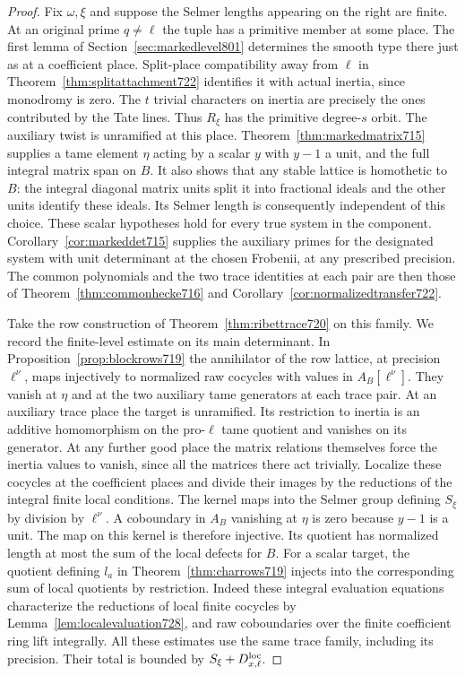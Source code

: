 \documentclass[a4paper,11pt]{article}
\theoremstyle{definition}
\theoremstyle{remark}
\numberwithin{equation}{section}
\begin{document}
\begin{proof}
Fix \(\omega,\xi\) and suppose the Selmer lengths appearing
on the right are finite. At an original prime \(q\ne\ell\)
the tuple has a primitive member at some place. The first
lemma of Section~\ref{sec:markedlevel801} determines the smooth
type there just as at a coefficient place. Split-place
compatibility away from \(\ell\) in Theorem~\ref{thm:splitattachment722}
identifies it with actual inertia, since monodromy is zero.
The \(t\) trivial characters on inertia are precisely the
ones contributed by the Tate lines. Thus \(R_\xi\) has the
primitive degree-\(s\) orbit. The auxiliary twist is unramified
at this place. Theorem~\ref{thm:markedmatrix715} supplies a
tame element \(\eta\) acting by a scalar \(y\) with \(y-1\)
a unit, and the full integral matrix span on \(B\). It also
shows that any stable lattice is homothetic to \(B\): the
integral diagonal matrix units split it into fractional ideals
and the other units identify these ideals. Its Selmer length
is consequently independent of this choice. These scalar
hypotheses hold for every true system in the component.
Corollary~\ref{cor:markeddet715} supplies the auxiliary primes
for the designated system with unit determinant at the chosen
Frobenii, at any prescribed precision. The common polynomials
and the two trace identities at each pair are then those of
Theorem~\ref{thm:commonhecke716} and
Corollary~\ref{cor:normalizedtransfer722}.

Take the row construction of Theorem~\ref{thm:ribettrace720}
on this family. We record the finite-level estimate on its
main determinant. In Proposition~\ref{prop:blockrows719} the
annihilator of the row lattice, at precision \(\ell^\nu\), maps
injectively to normalized raw cocycles with values in
\(A_B[\ell^\nu]\). They vanish at \(\eta\) and at the two
auxiliary tame generators at each trace pair. At an auxiliary
trace place the target is unramified. Its restriction to
inertia is an additive homomorphism on the pro-\(\ell\) tame
quotient and vanishes on its generator. At any further good
place the matrix relations themselves force the inertia
values to vanish, since all the matrices there act trivially.
Localize these cocycles at the coefficient places and divide
their images by the reductions of the integral finite local
conditions. The kernel maps into the Selmer group defining
\(S_\xi\) by division by \(\ell^\nu\). A coboundary in \(A_B\)
vanishing at \(\eta\) is zero because \(y-1\) is a unit. The
map on this kernel is therefore injective. Its quotient has
normalized length at most the sum of the local defects for
\(B\). For a scalar target, the quotient defining \(l_a\)
in Theorem~\ref{thm:charrows719} injects into the corresponding
sum of local quotients by restriction. Indeed these integral
evaluation equations characterize the reductions of local finite
cocycles by Lemma~\ref{lem:localevaluation728}, and raw
coboundaries over the finite coefficient ring lift integrally.
All these estimates use the same trace family, including its
precision. Their total is bounded by \(S_\xi+D_{x,\ell}^{\rm loc}\).


\end{proof}
\end{document}
